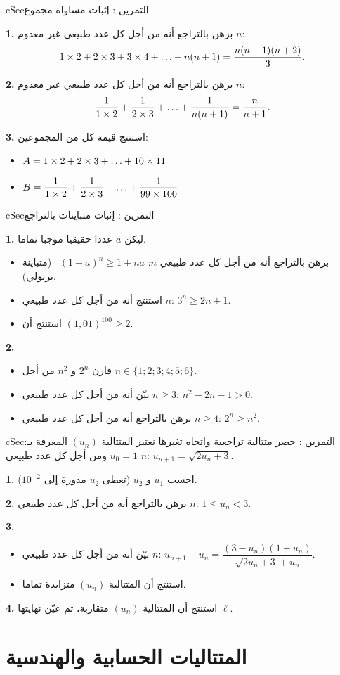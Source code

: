 \documentclass[12pt,a4paper]{article}
\newenvironment{BOX}[2]{\begin{otherlanguage}{english}\begin{arbox}{#1}{#2}}{\end{arbox}\end{otherlanguage}}
\newcounter{exo}
\newenvironment{tamrin}[1]{\stepcounter{exo}\begin{BOX}{cSec}{التمرين \theexo: #1}}{\end{BOX}}
\renewcommand{\dots}{\mathinner{\ldotp\ldotp\ldotp}}
\newenvironment{sq}{\begin{itemize}[leftmargin=2.4em,itemsep=3pt]}{\end{itemize}}
\newcommand{\qa}{\item[(أ)]}\newcommand{\qb}{\item[(ب)]}\newcommand{\qc}{\item[(جـ)]}\newcommand{\qd}{\item[(د)]}\newcommand{\qe}{\item[(هـ)]}
\newcommand{\QQ}[1]{\par\smallskip\textbf{#1.} }
\begin{document}
\begin{tamrin}{إثبات مساواة مجموع}
\QQ{1} برهن بالتراجع أنه من أجل كل عدد طبيعي غير معدوم $n$:
\[
1\times 2+2\times 3+3\times 4+\dots+n(n+1)=\frac{n(n+1)(n+2)}{3} .
\]
\QQ{2} برهن بالتراجع أنه من أجل كل عدد طبيعي غير معدوم $n$:
\[
\frac{1}{1\times 2}+\frac{1}{2\times 3}+\dots+\frac{1}{n(n+1)}=\frac{n}{n+1} .
\]
\QQ{3} استنتج قيمة كل من المجموعين:
\begin{sq}
\qa $A=1\times 2+2\times 3+\dots+10\times 11$
\qb $B=\dfrac{1}{1\times 2}+\dfrac{1}{2\times 3}+\dots+\dfrac{1}{99\times 100}$
\end{sq}
\end{tamrin}

\begin{tamrin}{إثبات متباينات بالتراجع}
\QQ{1} ليكن $a$ عددا حقيقيا موجبا تماما.
\begin{sq}
\qa برهن بالتراجع أنه من أجل كل عدد طبيعي $n$: $(1+a)^{n}\geqslant 1+na$ \ (متباينة برنولي).
\qb استنتج أنه من أجل كل عدد طبيعي $n$: $3^{n}\geqslant 2n+1$.
\qc استنتج أن $(1{,}01)^{100}\geqslant 2$.
\end{sq}
\QQ{2}
\begin{sq}
\qa قارن $2^{n}$ و $n^{2}$ من أجل $n\in\{1;2;3;4;5;6\}$.
\qb بيّن أنه من أجل كل عدد طبيعي $n\geqslant 3$: $n^{2}-2n-1>0$.
\qc برهن بالتراجع أنه من أجل كل عدد طبيعي $n\geqslant 4$: $2^{n}\geqslant n^{2}$.
\end{sq}
\end{tamrin}

\begin{tamrin}{حصر متتالية تراجعية واتجاه تغيرها}
نعتبر المتتالية $(u_n)$ المعرفة بـ: $u_0=1$ ومن أجل كل عدد طبيعي $n$: $u_{n+1}=\sqrt{2u_n+3}$.
\QQ{1} احسب $u_1$ و $u_2$ (تعطى $u_2$ مدورة إلى $10^{-2}$).
\QQ{2} برهن بالتراجع أنه من أجل كل عدد طبيعي $n$: $1\leqslant u_n<3$.
\QQ{3}
\begin{sq}
\qa بيّن أنه من أجل كل عدد طبيعي $n$: $u_{n+1}-u_n=\dfrac{(3-u_n)(1+u_n)}{\sqrt{2u_n+3}+u_n}$.
\qb استنتج أن المتتالية $(u_n)$ متزايدة تماما.
\end{sq}
\QQ{4} استنتج أن المتتالية $(u_n)$ متقاربة، ثم عيّن نهايتها $\ell$.
\end{tamrin}

\section{المتتاليات الحسابية والهندسية}
\end{document}
